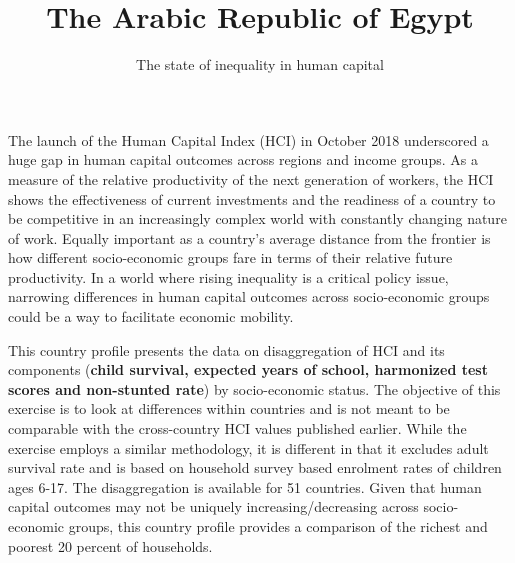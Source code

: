 \documentclass[8pt,]{article}
\title{The Arabic Republic of Egypt}
\author{The state of inequality in human capital}
\date{}
\begin{document}
\maketitle

\newcommand\boldblue[1]{\textcolor{bondiblue}{\textbf{#1}}}

The launch of the Human Capital Index (HCI) in October 2018 underscored
a huge gap in human capital outcomes across regions and income groups.
As a measure of the relative productivity of the next generation of
workers, the HCI shows the effectiveness of current investments and the
readiness of a country to be competitive in an increasingly complex
world with constantly changing nature of work. Equally important as a
country's average distance from the frontier is how different
socio-economic groups fare in terms of their relative future
productivity. In a world where rising inequality is a critical policy
issue, narrowing differences in human capital outcomes across
socio-economic groups could be a way to facilitate economic mobility.

This country profile presents the data on disaggregation of HCI and its
components (\textbf{child survival, expected years of school, harmonized
test scores and non-stunted rate}) by socio-economic status. The
objective of this exercise is to look at differences within countries
and is not meant to be comparable with the cross-country HCI values
published earlier. While the exercise employs a similar methodology, it
is different in that it excludes adult survival rate and is based on
household survey based enrolment rates of children ages 6-17. The
disaggregation is available for 51 countries. Given that human capital
outcomes may not be uniquely increasing/decreasing across socio-economic
groups, this country profile provides a comparison of the richest and
poorest 20 percent of households.
\end{document}
